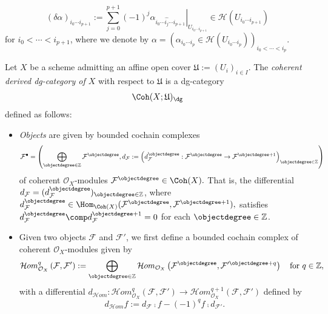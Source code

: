 $$
\left(\delta\alpha\right)_{i_0\cdots i_{p+1}}
:=
\sum_{j=0}^{p+1}
(-1)^j
\left.\alpha_{i_0\cdots\hat{i_j}\cdots i_{p+1}}\right|_{U_{i_0\cdots i_{p+1}}}
\in
\mathcal{H}(U_{i_0\cdots i_{p+1}})
$$
for
$i_0<\cdots<i_{p+1}$,
where we denote by
$
\alpha
=
\left(
\alpha_{i_0\cdots i_p}
\in\mathcal{H}(U_{i_0\cdots i_p})
\right)_{i_0<\cdots<i_p}.
$
\begin{dfn}\label{dfn:dg-enhancement-Coh}
Let $X$ be a scheme admitting an affine open cover
$\mathfrak{U}:=(U_i)_{i\in I}$.
The
\emph{coherent derived dg-category of $X$}
with respect to
$\mathfrak{U}$
is a dg-category
$$
\Coh(X;\mathfrak{U})_{\dg}
$$
defined as follows:
\begin{itemize}
\item
\emph{Objects} are given by bounded cochain complexes
$$
\mathcal{F}^{\bullet}
=
\left(
\bigoplus_{\objectdegree\in\mathbb{Z}}
\mathcal{F}^{\objectdegree},
d_{\mathcal{F}}:=\left(d_{\mathcal{F}}^{\objectdegree}:\mathcal{F}^{\objectdegree}\rightarrow \mathcal{F}^{\objectdegree+1}\right)_{\objectdegree\in\mathbb{Z}}\right)
$$
of coherent $\mathcal{O}_X$-modules
$
\mathcal{F}^{\objectdegree}
\in
\Coh(X).
$
That is,
the differential
$d_{\mathcal{F}}=(d_{\mathcal{F}}^{\objectdegree})_{\objectdegree\in\mathbb{Z}}$,
where
$d_{\mathcal{F}}^{\objectdegree}
\in
\Hom_{\Coh(X)}(\mathcal{F}^{\objectdegree},\mathcal{F}^{\objectdegree+1}),
$
satisfies
$d_{\mathcal{F}}^{\objectdegree}\comp d_{\mathcal{F}}^{\objectdegree+1}=0$
for each $\objectdegree\in\mathbb{Z}$.

\item
Given two objects
$\mathcal{F}$ and $\mathcal{F}'$,
we first define a bounded cochain complex
of coherent $\mathcal{O}_X$-modules
given by
$$
\mathcal{H}om_{\mathcal{O}_X}^q\left(\mathcal{F},\mathcal{F}'\right)
:=
\bigoplus_{\objectdegree\in\mathbb{Z}}
\mathcal{H}om_{\mathcal{O}_X}\left(\mathcal{F}^{\objectdegree},\mathcal{F}'^{\objectdegree+q}\right)
\quad\text{for }q\in\mathbb{Z},
$$
with
a differential
$
d_{\mathcal{H}om}:
\mathcal{H}om_{\mathcal{O}_X}^q(\mathcal{F},\mathcal{F}')
\rightarrow
\mathcal{H}om_{\mathcal{O}_X}^{q+1}(\mathcal{F},\mathcal{F}')
$
defined by
$$
d_{\mathcal{H}om}f:=d_{\mathcal{F}}\comp f - (-1)^q f\comp d_{\mathcal{F}'}.
$$




\end{itemize}
\end{dfn}
